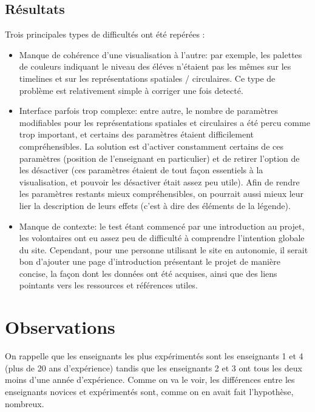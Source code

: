 \documentclass{article}
\begin{document}
\subsection{Résultats}
Trois principales types de difficultés ont été repérées :
\begin{itemize}
    \item Manque de cohérence d'une visualisation à l'autre: par exemple, les palettes de couleurs indiquant le niveau des éléves n'étaient pas les mêmes sur les timelines et sur les représentations spatiales / circulaires. Ce type de problème est relativement simple à corriger une fois detecté.
    \item Interface parfois trop complexe: entre autre, le nombre de paramètres modifiables pour les représentations spatiales et circulaires a été percu comme trop important, et certains des paramètres étaient difficilement compréhensibles. La solution est d'activer constamment certains de ces paramètres (position de l'enseignant en particulier) et de retirer l'option de les désactiver (ces paramètres étaient de tout façon essentiels à la visualisation, et pouvoir les désactiver était assez peu utile). Afin de rendre les paramètres restants mieux compréhensibles, on pourrait aussi mieux leur lier la description de leurs effets (c'est à dire des éléments de la légende).
    \item Manque de contexte: le test étant commencé par une introduction au projet, les volontaires ont eu assez peu de difficulté à comprendre l'intention globale du site. Cependant, pour une personne utilisant le site en autonomie, il serait bon d'ajouter une page d'introduction présentant le projet de manière concise, la façon dont les données ont été acquises, ainsi que des liens pointants vers les ressources et références utiles.
\end{itemize}

\section{Observations}
On rappelle que les enseignants les plus expérimentés sont les enseignants 1 et 4 (plus de 20 ans d'expérience) tandis que les enseignants 2 et 3 ont tous les deux moins d'une année d'expérience. Comme on va le voir, les différences entre les enseignants novices et expérimentés sont, comme on en avait fait l'hypothèse, nombreux.
\end{document}
